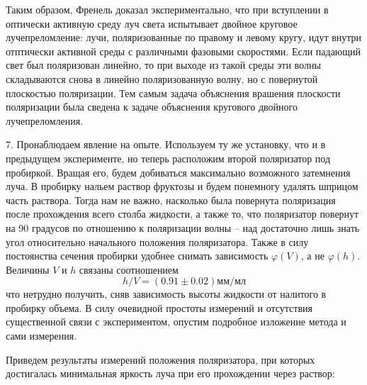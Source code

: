 \documentclass[14pt]{article}
\begin{document}
Таким образом, Френель доказал экспериментально, что при вступлении в оптически активную среду луч света испытывает двойное круговое лучепреломление: лучи, поляризованные по
правому и левому кругу, идут внутри отптически активной среды с различными фазовыми скоростями. Если падающий свет был поляризован линейно, то при выходе из такой среды эти волны складываются снова в линейно поляризованную волну, но с повернутой плоскостью поляризации. Тем самым задача объяснения врашения плоскости поляризации была сведена к задаче объяснения кругового двойного лучепреломления.

7. Пронаблюдаем явление на опыте. Используем ту же установку, что и в предыдущем эксперименте, но теперь расположим второй поляризатор под пробиркой. Вращая его, будем добиваться максимально возможного затемнения луча. В пробирку нальем раствор фруктозы и будем понемногу удалять шприцом часть раствора. Тогда нам не важно, насколько была повернута поляризация после прохождения всего столба жидкости, а также то, что поляризатор повернут на 90 градусов по отношению к поляризации волны -- над достаточно лишь знать угол относительно начального положения поляризатора. Также в силу постоянства сечения пробирки удобнее снимать зависимость $\varphi(V)$, а не $\varphi(h)$. Величины 
$V$ и $h$ связаны соотношением
$$
	h/V = (0.91 \pm 0.02) \text{мм/мл}
$$
что нетрудно получить, сняв зависимость высоты жидкости от налитого в пробирку объема. В силу очевидной простоты измерений и отсутствия существенной связи с экспериментом, опустим подробное изложение метода и сами измерения.

Приведем результаты измерений положения поляризатора, при которых достигалась минимальная яркость луча при его прохождении через раствор:
\end{document}
